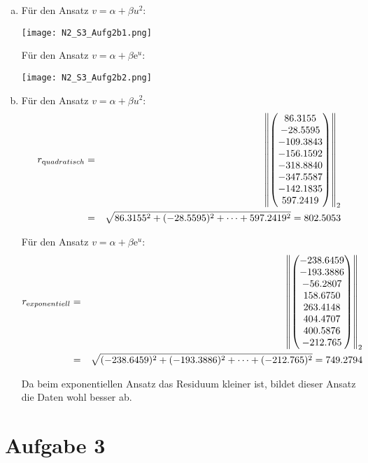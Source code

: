 \documentclass[11pt]{article} %
\newcommand{\e}{\mathrm{e}}
\begin{document}
\begin{enumerate}[a)]
\item

Für den Ansatz $v = \alpha + \beta u^2$:

\texttt{[image: N2\_S3\_Aufg2b1.png]}

Für den Ansatz $v = \alpha + \beta\e^u$:

\texttt{[image: N2\_S3\_Aufg2b2.png]}

\item
Für den Ansatz $v = \alpha + \beta u^2$:
\begin{eqnarray*}
r_{\text quadratisch} &=& \left\lVert\begin{pmatrix}86.3155\\
-28.5595\\
-109.3843\\
-156.1592\\
-318.8840\\
-347.5587\\
-142.1835\\
597.2419\\ \end{pmatrix}\right\rVert_2 \\ &=&  \sqrt{86.3155^2 + (-28.5595)^2 + \dots + 597.2419^2 } =  802.5053
\end{eqnarray*}

Für den Ansatz $v = \alpha + \beta\e^u$:
\begin{eqnarray*}
r_{\text exponentiell} &=& \left\lVert\begin{pmatrix}-238.6459\\
-193.3886\\
-56.2807\\
158.6750\\
263.4148\\
404.4707\\
400.5876\\
-212.765 \\ \end{pmatrix}\right\rVert_2 \\ &=&  \sqrt{(-238.6459)^2 + (-193.3886)^2 + \dots + (-212.765)^2 } =  749.2794
\end{eqnarray*}

Da beim exponentiellen Ansatz das Residuum kleiner ist, bildet dieser  Ansatz die Daten wohl besser ab.

\end{enumerate}

\section*{Aufgabe 3}
\end{document}
